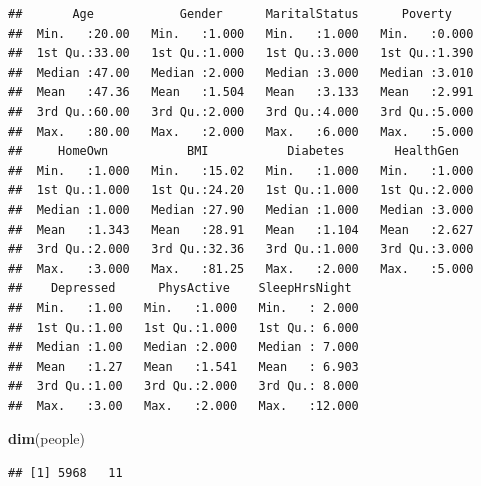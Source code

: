 \documentclass[]{article}
\newenvironment{Shaded}{\begin{snugshade}}{\end{snugshade}}
\newcommand{\KeywordTok}[1]{\textcolor[rgb]{0.13,0.29,0.53}{\textbf{{#1}}}}
\newcommand{\DecValTok}[1]{\textcolor[rgb]{0.00,0.00,0.81}{{#1}}}
\newcommand{\StringTok}[1]{\textcolor[rgb]{0.31,0.60,0.02}{{#1}}}
\newcommand{\CommentTok}[1]{\textcolor[rgb]{0.56,0.35,0.01}{\textit{{#1}}}}
\newcommand{\NormalTok}[1]{{#1}}
\begin{document}
\begin{verbatim}
##       Age            Gender      MaritalStatus      Poverty     
##  Min.   :20.00   Min.   :1.000   Min.   :1.000   Min.   :0.000  
##  1st Qu.:33.00   1st Qu.:1.000   1st Qu.:3.000   1st Qu.:1.390  
##  Median :47.00   Median :2.000   Median :3.000   Median :3.010  
##  Mean   :47.36   Mean   :1.504   Mean   :3.133   Mean   :2.991  
##  3rd Qu.:60.00   3rd Qu.:2.000   3rd Qu.:4.000   3rd Qu.:5.000  
##  Max.   :80.00   Max.   :2.000   Max.   :6.000   Max.   :5.000  
##     HomeOwn           BMI           Diabetes       HealthGen    
##  Min.   :1.000   Min.   :15.02   Min.   :1.000   Min.   :1.000  
##  1st Qu.:1.000   1st Qu.:24.20   1st Qu.:1.000   1st Qu.:2.000  
##  Median :1.000   Median :27.90   Median :1.000   Median :3.000  
##  Mean   :1.343   Mean   :28.91   Mean   :1.104   Mean   :2.627  
##  3rd Qu.:2.000   3rd Qu.:32.36   3rd Qu.:1.000   3rd Qu.:3.000  
##  Max.   :3.000   Max.   :81.25   Max.   :2.000   Max.   :5.000  
##    Depressed      PhysActive    SleepHrsNight   
##  Min.   :1.00   Min.   :1.000   Min.   : 2.000  
##  1st Qu.:1.00   1st Qu.:1.000   1st Qu.: 6.000  
##  Median :1.00   Median :2.000   Median : 7.000  
##  Mean   :1.27   Mean   :1.541   Mean   : 6.903  
##  3rd Qu.:1.00   3rd Qu.:2.000   3rd Qu.: 8.000  
##  Max.   :3.00   Max.   :2.000   Max.   :12.000
\end{verbatim}

\begin{Shaded}
\begin{Highlighting}[]
\KeywordTok{dim}\NormalTok{(people)}
\end{Highlighting}
\end{Shaded}

\begin{verbatim}
## [1] 5968   11
\end{verbatim}

\begin{Shaded}
\end{Shaded}
\end{document}
